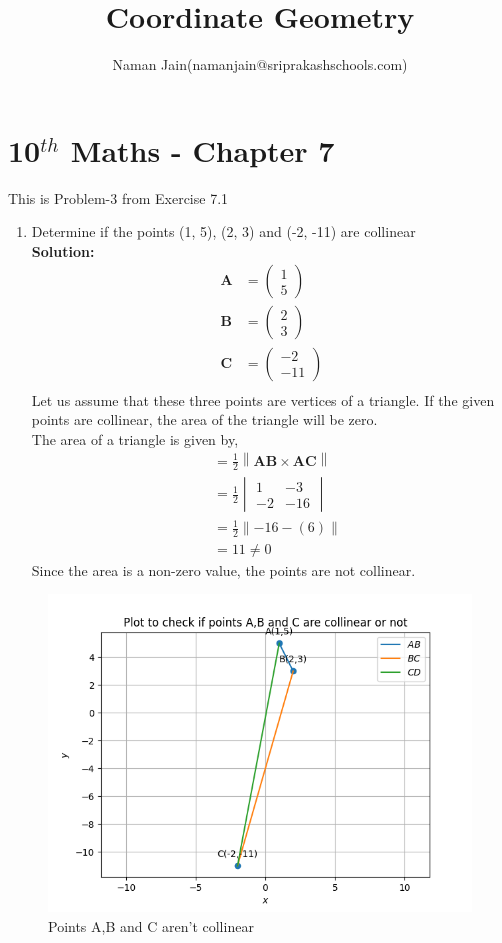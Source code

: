 \documentclass[12pt]{article}
\title{Coordinate Geometry}
\author{Naman Jain(namanjain@sriprakashschools.com)}
\newcommand{\myvec}[1]{\ensuremath{\begin{pmatrix}#1\end{pmatrix}}}
\newcommand{\mydet}[1]{\ensuremath{\begin{vmatrix}#1\end{vmatrix}}}
\newcommand{\solution}{\noindent \textbf{Solution: }}
\providecommand{\norm}[1]{\left\lVert#1\right\rVert}
\let\vec\mathbf
\begin{document}
\maketitle
\section*{10$^{th}$ Maths - Chapter 7}
This is Problem-3 from Exercise 7.1
\begin{enumerate}
\item Determine if the points (1, 5), (2, 3) and (-2, -11) are collinear\\ 
\solution \\
\begin{align}
\vec{A}&=\myvec{1\\5}\\
\vec{B}&=\myvec{2\\3}\\
\vec{C}&=\myvec{-2\\-11}\\
\end{align}
Let us assume that these three points are vertices of a triangle. If the given points are collinear, the area of the triangle will be zero.
\\The area of a triangle is given by,
\begin{align}
   &=\frac{1}{2}\norm{\vec{AB}\times\vec{AC}}\\ 
   &=\frac{1}{2}\mydet{1&-3\\-2&-16}\\
   &=\frac{1}{2}\norm{-16-(6)}\\
   &=11\neq 0
\end{align}
Since the area is a non-zero value, the points are not collinear.
\end{enumerate}
\begin{figure}[H]
			\centering
			\includegraphics[width=\columnwidth]{figs/Figure_1.png}
			\caption{Points A,B and C aren't collinear}
			\label{fig:20}
		\end{figure}
\end{document}
